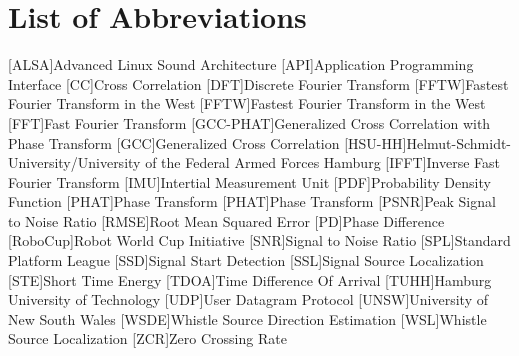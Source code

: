 \chapter*{List of Abbreviations}
\label{sec:abbreviations}

\begin{acronym}\itemsep0pt
  [ALSA]{Advanced Linux Sound Architecture}
  [API]{Application Programming Interface}
  [CC]{Cross Correlation}
  [DFT]{Discrete Fourier Transform}
  [FFTW]{Fastest Fourier Transform in the West}
  [FFTW]{Fastest Fourier Transform in the West}
  [FFT]{Fast Fourier Transform}
  [GCC-PHAT]{Generalized Cross Correlation with Phase Transform}
  [GCC]{Generalized Cross Correlation}
  [HSU-HH]{Helmut-Schmidt-University/University of the Federal Armed Forces Hamburg}
  [IFFT]{Inverse Fast Fourier Transform}
  [IMU]{Intertial Measurement Unit}
  [PDF]{Probability Density Function}
  [PHAT]{Phase Transform}
  [PHAT]{Phase Transform}
  [PSNR]{Peak Signal to Noise Ratio}
  [RMSE]{Root Mean Squared Error}
  [PD]{Phase Difference}
  [RoboCup]{Robot World Cup Initiative}
  [SNR]{Signal to Noise Ratio}
  [SPL]{Standard Platform League}
  [SSD]{Signal Start Detection}
  [SSL]{Signal Source Localization}
  [STE]{Short Time Energy}
  [TDOA]{Time Difference Of Arrival}
  [TUHH]{Hamburg University of Technology}
  [UDP]{User Datagram Protocol}
  [UNSW]{University of New South Wales}
  [WSDE]{Whistle Source Direction Estimation}
  [WSL]{Whistle Source Localization}
  [ZCR]{Zero Crossing Rate}
\end{acronym}
